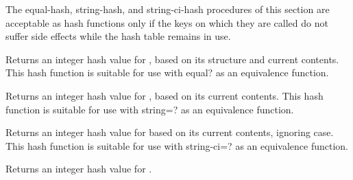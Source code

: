The {\cf equal-hash}, {\cf string-hash}, and {\cf string-ci-hash}
procedures of this section are acceptable as hash functions only
if the keys on which they are called do not suffer side effects
while the hash table remains in use.

\begin{entry}{}

Returns an integer hash value for , based on
its structure and current contents.  This hash function is suitable
for use with {\cf equal?} as an equivalence function.
\end{entry}

\begin{entry}{}

Returns an integer hash value for , based on
its current contents.
This hash function is suitable
for use with {\cf string=?} as an equivalence function.
\end{entry}

\begin{entry}{}

Returns an integer hash value for  based on
its current contents, ignoring case.
This hash function is suitable
for use with {\cf string-ci=?} as an equivalence function.
\end{entry}

\begin{entry}{}

Returns an integer hash value for .
\end{entry}

